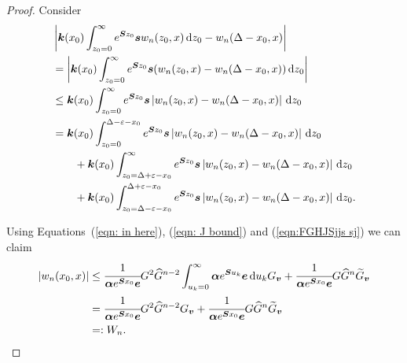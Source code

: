 \begin{proof}
	Consider
	\begin{align}
		\nonumber&\left|\boldsymbol k(x_0) \int_{z_0=0}^\infty e^{\boldsymbol Sz_0}\boldsymbol sw_n(z_0,x)\, \mathrm{d} z_0 - w_n(\Delta - x_0,x) \right|
		\\\nonumber&= \left|\boldsymbol k(x_0) \int_{z_0=0}^\infty e^{\boldsymbol Sz_0}\boldsymbol s(w_n(z_0,x) - w_n(\Delta - x_0,x)) \, \mathrm{d} z_0\right|
		\\\nonumber&\leq \boldsymbol k(x_0) \int_{z_0=0}^\infty e^{\boldsymbol Sz_0}\boldsymbol s  \left|w_n(z_0,x) - w_n(\Delta - x_0,x)\right| \, \mathrm{d} z_0
		\\\nonumber&= \boldsymbol k(x_0) \int_{z_0=0}^{\Delta-\varepsilon-x_0} e^{\boldsymbol Sz_0}\boldsymbol s  \left|w_n(z_0,x) - w_n(\Delta - x_0,x)\right| \, \mathrm{d} z_0
		\\\nonumber&\qquad{}+\boldsymbol k(x_0) \int_{z_0=\Delta+\varepsilon-x_0}^\infty e^{\boldsymbol Sz_0}\boldsymbol s  \left|w_n(z_0,x) - w_n(\Delta - x_0,x)\right| \, \mathrm{d} z_0
		\\\label{eqn: KASJF}&\qquad{}+\boldsymbol k(x_0) \int_{z_0=\Delta-\varepsilon-x_0}^{\Delta+\varepsilon-x_0} e^{\boldsymbol Sz_0}\boldsymbol s  \left|w_n(z_0,x) - w_n(\Delta - x_0,x)\right| \, \mathrm{d} z_0.
	\end{align}
		
		Using Equations~(\ref{eqn: in here}), (\ref{eqn: J bound}) and (\ref{eqn:FGHJSjjs sj}) we can claim
		\begin{align}
			|w_n(x_0,x)| &\leq \cfrac{1}{\boldsymbol \alpha e^{\boldsymbol{S} x_0}\boldsymbol e}G^2 \widehat G^{n-2}  
			\int_{u_k=0}^\infty \boldsymbol \alpha e^{\boldsymbol{S}u_k}\boldsymbol e \, \mathrm{d} u_k G_{\boldsymbol v} + \cfrac{1}{\boldsymbol \alpha e^{\boldsymbol{S}x_0}\boldsymbol e}G\widehat G^{n}\widetilde G_{\boldsymbol v} \nonumber 
			\\& = \cfrac{1}{\boldsymbol \alpha e^{\boldsymbol{S} x_0}\boldsymbol e}G^2
			 \widehat G^{n-2} G_{\boldsymbol v} + \cfrac{1}{\boldsymbol \alpha e^{\boldsymbol{S}x_0}\boldsymbol e}G\widehat G^{n}\widetilde G_{\boldsymbol v} \nonumber 
			 \\&=:W_n.
		\end{align}
		

\end{proof}

